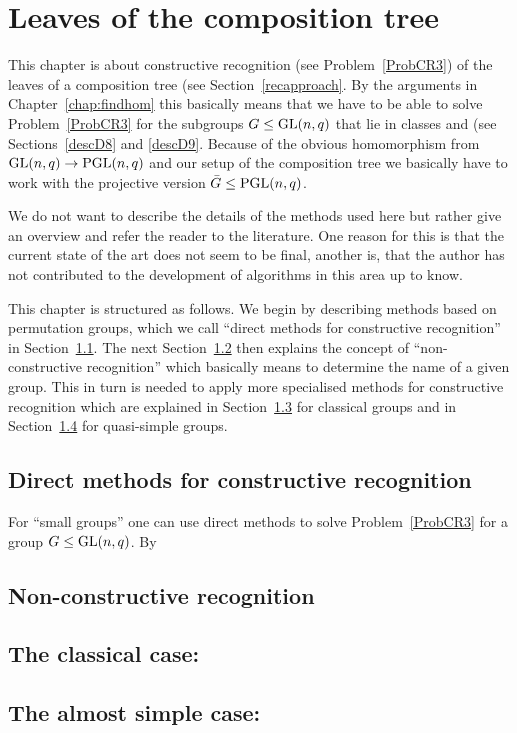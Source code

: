
\chapter{Leaves of the composition tree}
\label{chap:leaves}

This chapter is about constructive recognition (see
Problem~\ref{ProbCR3}) of the leaves of a
composition tree (see Section~\ref{recapproach}. By the arguments in
Chapter~\ref{chap:findhom} this basically means that we have to be
able to solve Problem~\ref{ProbCR3} for the subgroups $G \le \GL(n,q)$
that lie in classes  and  (see Sections~\ref{descD8} and
\ref{descD9}. Because of the obvious homomorphism from $\GL(n,q) \to
\PGL(n,q)$ and our setup of the composition tree we basically have
to work with the projective version $\bar G \le \PGL(n,q)$.

We do not want to describe the details of the methods used here but
rather give an overview and refer the reader to the literature.
One reason for this is that the current state of the art does not seem
to be final, another is, that the author has not contributed to the
development of algorithms in this area up to know.

This chapter is structured as follows. We begin by describing methods
based on permutation groups, which we call ``direct methods for
constructive recognition'' in Section~\ref{solvedirect}. The next
Section~\ref{nonconstructive} then explains the concept of
``non-constructive recognition'' which basically means to determine
the name of a given group. This in turn is needed to apply more
specialised methods for constructive recognition which are explained
in Section~\ref{solveD8} for classical groups and
in Section~\ref{solveD9} for quasi-simple groups.

\section{Direct methods for constructive recognition}
\label{solvedirect}

For ``small groups'' one can use direct methods to solve
Problem~\ref{ProbCR3} for a group $G \le \GL(n,q)$. By

\section{Non-constructive recognition}
\label{nonconstructive}

\section{The classical case: }
\label{solveD8}

\section{The almost simple case: }
\label{solveD9}

